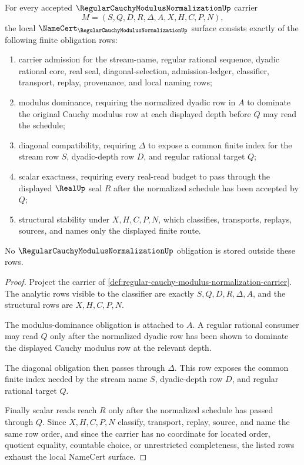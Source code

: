 \begin{theorem}
\label{thm:regular-cauchy-modulus-normalization-namecert-obligations}
For every accepted $\RegularCauchyModulusNormalizationUp$ carrier
$$
M=(S,Q,D,R,\Delta,A,X,H,C,P,N),
$$
the local $\NameCert_{\RegularCauchyModulusNormalizationUp}$ surface consists exactly of the following finite obligation rows:
\begin{enumerate}
\item carrier admission for the stream-name, regular rational sequence, dyadic rational core, real seal, diagonal-selection, admission-ledger, classifier, transport, replay, provenance, and local naming rows;
\item modulus dominance, requiring the normalized dyadic row in $A$ to dominate the original Cauchy modulus row at each displayed depth before $Q$ may read the schedule;
\item diagonal compatibility, requiring $\Delta$ to expose a common finite index for the stream row $S$, dyadic-depth row $D$, and regular rational target $Q$;
\item scalar exactness, requiring every real-read budget to pass through the displayed $\RealUp$ seal $R$ after the normalized schedule has been accepted by $Q$;
\item structural stability under $X,H,C,P,N$, which classifies, transports, replays, sources, and names only the displayed finite route.
\end{enumerate}
No $\RegularCauchyModulusNormalizationUp$ obligation is stored outside these rows.
\end{theorem}
\begin{proof}
Project the carrier of \autoref{def:regular-cauchy-modulus-normalization-carrier}. The analytic rows visible to the classifier are exactly $S,Q,D,R,\Delta,A$, and the structural rows are $X,H,C,P,N$.

The modulus-dominance obligation is attached to $A$. A regular rational consumer may read $Q$ only after the normalized dyadic row has been shown to dominate the displayed Cauchy modulus row at the relevant depth.

The diagonal obligation then passes through $\Delta$. This row exposes the common finite index needed by the stream name $S$, dyadic-depth row $D$, and regular rational target $Q$.

Finally scalar reads reach $R$ only after the normalized schedule has passed through $Q$. Since $X,H,C,P,N$ classify, transport, replay, source, and name the same row order, and since the carrier has no coordinate for located order, quotient equality, countable choice, or unrestricted completeness, the listed rows exhaust the local NameCert surface.
\end{proof}

